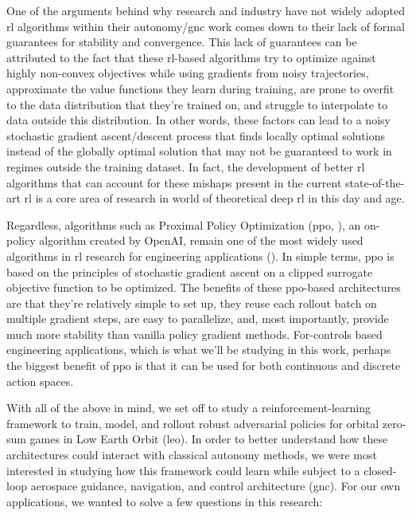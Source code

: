 One of the arguments behind why research and industry have not widely adopted \acs{rl} algorithms within their autonomy/\acs{gnc} work comes down to their lack of formal guarantees for stability and convergence. This lack of guarantees can be attributed to the fact that these \acs{rl}-based algorithms try to optimize against highly non-convex objectives while using gradients from noisy trajectories, approximate the value functions they learn during training, are prone to overfit to the data distribution that they're trained on, and struggle to interpolate to data outside this distribution. In other words, these factors can lead to a noisy stochastic gradient ascent/descent process that finds locally optimal solutions instead of the globally optimal solution that may not be guaranteed to work in regimes outside the training dataset. In fact, the development of better \acs{rl} algorithms that can account for these mishaps present in the current state-of-the-art \acs{rl} is a core area of research in world of theoretical deep \acs{rl} in this day and age. 

Regardless, algorithms such as Proximal Policy Optimization (\acs{ppo}, \cite{schulman2017ppo}), an on-policy algorithm created by OpenAI, remain one of the most widely used algorithms in \acs{rl} research for engineering applications (\cite{francois2018introduction}). In simple terms, \acs{ppo} is based on the principles of stochastic gradient ascent on a clipped surrogate objective function to be optimized. The benefits of these \acs{ppo}-based architectures are that they're relatively simple to set up, they reuse each rollout batch on multiple gradient steps, are easy to parallelize, and, most importantly, provide much more stability than vanilla policy gradient methods. For-controls based engineering applications, which is what we'll be studying in this work, perhaps the biggest benefit of \acs{ppo} is that it can be used for both continuous and discrete action spaces.



With all of the above in mind, we set off to study a reinforcement-learning framework to train, model, and rollout robust adversarial policies for orbital zero-sum games in Low Earth Orbit (\acs{leo}). In order to better understand how these architectures could interact with classical autonomy methods, we were most interested in studying how this framework could learn while subject to a closed-loop aerospace guidance, navigation, and control architecture (\acs{gnc}). For our own applications, we wanted to solve a few questions in this research:

